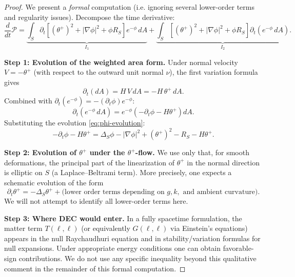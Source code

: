 \begin{proof}
We present a \emph{formal} computation (i.e. ignoring several lower-order terms and regularity issues). Decompose the time derivative:
\begin{equation}
\frac{d}{dt}\mathcal{P} = \underbrace{\int_S \partial_t\left[(\theta^+)^2 + |\nabla\phi|^2 + \phi R_S\right]e^{-\phi} \, dA}_{I_1} + \underbrace{\int_S \left[(\theta^+)^2 + |\nabla\phi|^2 + \phi R_S\right]\partial_t(e^{-\phi} \, dA)}_{I_2}.
\end{equation}

\textbf{Step 1: Evolution of the weighted area form.}
Under normal velocity $V = -\theta^+$ (with respect to the outward unit normal $\nu$), the first variation formula gives
\begin{equation}
\partial_t(dA) = H\,V\, dA = -H\,\theta^+\, dA.
\end{equation}
Combined with $\partial_t(e^{-\phi}) = -(\partial_t\phi)e^{-\phi}$:
\begin{equation}
\partial_t(e^{-\phi} \, dA) = e^{-\phi}\left(-\partial_t\phi - H\theta^+\right)dA.
\end{equation}
Substituting the evolution \eqref{eq:phi-evolution}:
\begin{equation}
-\partial_t\phi - H\theta^+ = \Delta_S\phi - |\nabla\phi|^2 + (\theta^+)^2 - R_S - H\theta^+.
\end{equation}

\textbf{Step 2: Evolution of $\theta^+$ under the $\theta^+$-flow.}
We use only that, for smooth deformations, the principal part of the linearization of $\theta^+$ in the normal direction is elliptic on $S$ (a Laplace--Beltrami term). More precisely, one expects a schematic evolution of the form
\begin{equation}
\partial_t\theta^+ = -\Delta_S\theta^+ + \text{(lower order terms depending on } g,k,\text{ and ambient curvature)}.
\label{eq:theta-evolution-schematic}
\end{equation}
We will not attempt to identify all lower-order terms here.

\textbf{Step 3: Where DEC would enter.}
In a fully spacetime formulation, the matter term $T(\ell,\ell)$ (or equivalently $G(\ell,\ell)$ via Einstein's equations) appears in the null Raychaudhuri equation and in stability/variation formulas for null expansions. Under appropriate energy conditions one can obtain favorable-sign contributions. We do not use any specific inequality beyond this qualitative comment in the remainder of this formal computation.


\end{proof}
